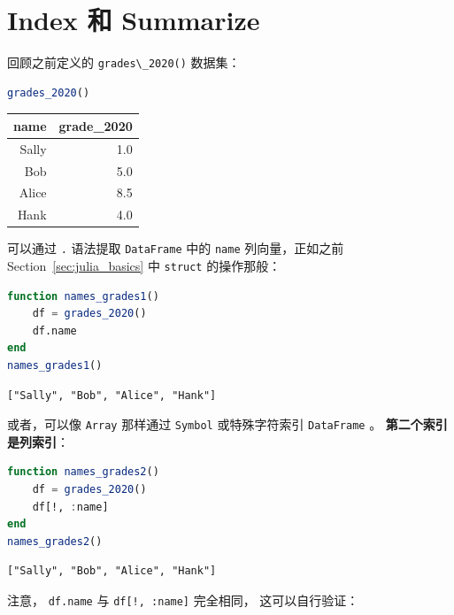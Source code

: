 \documentclass[
  notoc %
]{tufte-book}
\newcommand{\passthrough}[1]{#1}
\begin{document}
\hypertarget{sec:index_summarize}{%
\section{Index 和 Summarize}\label{sec:index_summarize}}

回顾之前定义的 \passthrough{\lstinline!grades\_2020()!} 数据集：

\begin{lstlisting}[language=Julia]
grades_2020()
\end{lstlisting}

\begin{longtable}[]{@{}rr@{}}
\toprule
name & grade\_2020 \\
\midrule
\endhead
Sally & 1.0 \\
Bob & 5.0 \\
Alice & 8.5 \\
Hank & 4.0 \\
\bottomrule
\end{longtable}

可以通过 \passthrough{\lstinline!.!} 语法提取
\passthrough{\lstinline!DataFrame!} 中的 \passthrough{\lstinline!name!}
列向量，正如之前 Section~\ref{sec:julia_basics} 中
\passthrough{\lstinline!struct!} 的操作那般：

\begin{lstlisting}[language=Julia]
function names_grades1()
    df = grades_2020()
    df.name
end
names_grades1()
\end{lstlisting}

\begin{lstlisting}[language=Output]
["Sally", "Bob", "Alice", "Hank"]
\end{lstlisting}

或者，可以像 \passthrough{\lstinline!Array!} 那样通过
\passthrough{\lstinline!Symbol!} 或特殊字符索引
\passthrough{\lstinline!DataFrame!} 。 \textbf{第二个索引是列索引}：

\begin{lstlisting}[language=Julia]
function names_grades2()
    df = grades_2020()
    df[!, :name]
end
names_grades2()
\end{lstlisting}

\begin{lstlisting}[language=Output]
["Sally", "Bob", "Alice", "Hank"]
\end{lstlisting}

注意， \passthrough{\lstinline!df.name!} 与
\passthrough{\lstinline"df[!, :name]"} 完全相同， 这可以自行验证：
\end{document}
